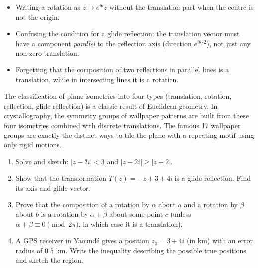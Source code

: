 \documentclass[11pt]{article}
\begin{document}
\begin{attention}
\begin{itemize}
\item Writing a rotation as $z\mapsto e^{i\theta}z$ without the translation part when the centre is not the origin.
\item Confusing the condition for a glide reflection: the translation vector must have a component \emph{parallel} to the reflection axis (direction $e^{i\theta/2}$), not just any non‑zero translation.
\item Forgetting that the composition of two reflections in parallel lines is a translation, while in intersecting lines it is a rotation.
\end{itemize}
\end{attention}

\begin{savaistu}
The classification of plane isometries into four types (translation, rotation, reflection, glide reflection) is a classic result of Euclidean geometry.  In crystallography, the symmetry groups of wallpaper patterns are built from these four isometries combined with discrete translations.  The famous 17 wallpaper groups are exactly the distinct ways to tile the plane with a repeating motif using only rigid motions.
\end{savaistu}

\begin{exercice}[Practice]
\begin{enumerate}
\item Solve and sketch: $|z-2i|<3$ and $|z-2i|\ge|z+2|$.
\item Show that the transformation $T(z)=-\overline{z}+3+4i$ is a glide reflection.  Find its axis and glide vector.
\item Prove that the composition of a rotation by $\alpha$ about $a$ and a rotation by $\beta$ about $b$ is a rotation by $\alpha+\beta$ about some point $c$ (unless $\alpha+\beta\equiv0\pmod{2\pi}$, in which case it is a translation).
\item A GPS receiver in Yaoundé gives a position $z_0=3+4i$ (in km) with an error radius of $0.5$ km.  Write the inequality describing the possible true positions and sketch the region.
\end{enumerate}
\end{exercice}
\end{document}

